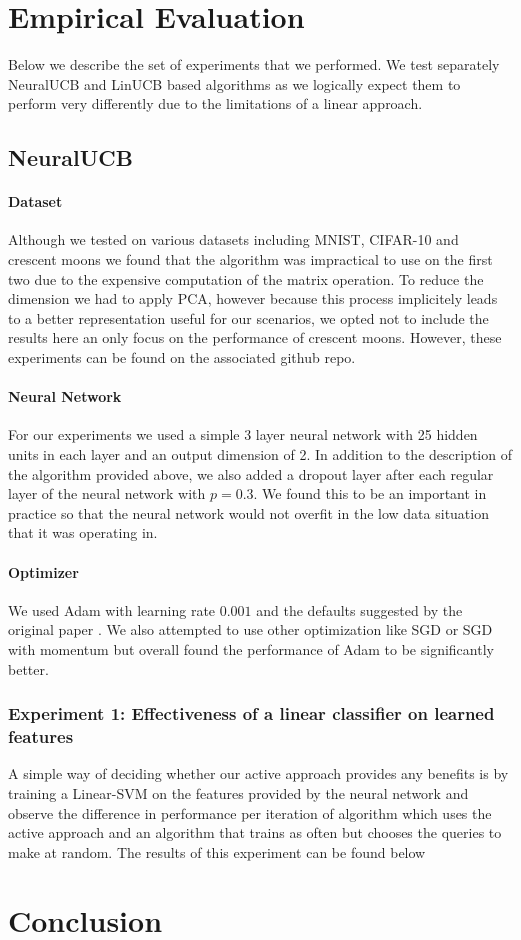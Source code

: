 \documentclass{article}
\begin{document}
\section{Empirical Evaluation}
Below we describe the set of experiments that we performed.
We test separately NeuralUCB and LinUCB based algorithms as we logically expect them to perform
very differently due to the limitations of a linear approach.

\subsection{NeuralUCB}

\paragraph{Dataset}
Although we tested on various datasets including MNIST, CIFAR-10 and crescent moons
we found that the algorithm was impractical to use on the first two due to the expensive computation
of the matrix operation.
To reduce the dimension we had to apply PCA, however because this process implicitely leads to a better representation
useful for our scenarios, we opted not to include the results here an only focus on the performance of crescent moons.
However, these experiments can be found on the associated github repo.

\paragraph{Neural Network}
For our experiments we used a simple 3 layer neural network with 25 hidden units in each layer and an output dimension of 2.
In addition to the description of the algorithm provided above, we also added a dropout layer after each regular layer of the neural network with
$p =0.3$. We found this to be an important in practice so that the neural network would not overfit in the low data situation that it was operating in.
\paragraph{Optimizer}
We used Adam with learning rate $0.001$ and the defaults suggested by the original paper \cite{adam}.
We also attempted to use other optimization like SGD or SGD with momentum but overall found the performance of Adam to be
significantly better.

\subsubsection{Experiment 1: Effectiveness of a linear classifier on learned features}
A simple way of deciding whether our active approach provides any benefits is by training a Linear-SVM
on the features provided by the neural network and observe the difference in performance per iteration of
algorithm which uses the active approach and an algorithm that trains as often but chooses the queries to make
at random. The results of this experiment can be found below


\section{Conclusion}




\end{document}
